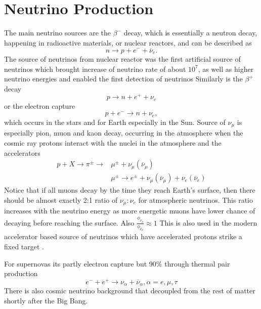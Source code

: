 \section{Neutrino Production}
The main neutrino sources \cite{FundamentalsOfNeutrinoPhysics.pdf} are the $\beta^-$ decay, which is essentially a neutron decay, happening in radioactive materials, or nuclear reactors, and can be described as
\begin{equation}
n\rightarrow p+e^-+\overline{\nu}_e.
\end{equation}
The source of neutrinos from nuclear reactor was the first artificial source of neutrinos which brought increase of neutrino rate of about $10^7$, as well as higher neutrino energies and enabled the first detection of neutrinos \cite{NeutrinoPhysicsCowanReines.pdf}
Similarly is the $\beta^+$ decay
\begin{equation}
p\rightarrow n+e^++\nu_e
\end{equation}
or the electron capture
\begin{equation}
p+e^-\rightarrow n+\nu_e,
\end{equation}
which occurs in the stars and for Earth especially in the Sun.
Source of $\nu_\mu$ is especially pion, muon and kaon decay, occurring in the atmosphere when the cosmic ray protons interact with the nuclei in the atmosphere and the accelerators
\begin{align}
p+X \rightarrow \pi^\pm \rightarrow &\mu^\pm + \nu_\mu\left(\overline{\nu}_\mu\right) \\
 & \mu^\pm \rightarrow e^\pm + \nu_\mu\left(\overline{\nu}_\mu\right) + \nu_e\left(\overline{\nu}_e\right)
\end{align}
Notice that if all muons decay by the time they reach Earth's surface, then there should be almost exactly 2:1 ratio of $\nu_\mu : \nu_e$ for atmospheric neutrinos. This ratio increases with the neutrino energy as more energetic muons have lower chance of decaying before reaching the surface. Also $\frac{\phi_{\nu_\mu}}{\phi_{\overline{\nu}_\mu}}\approx 1$ This is also used in the modern accelerator based source of neutrinos which have accelerated protons strike a fixed target \cite{GoodmanAdvancesInNeutrinoPhysics.pdf}\cite{SchwartzAccelerators.pdf}.

For supernovas its partly electron capture but 90\% through thermal pair production
\begin{equation}
e^-+e^+\rightarrow\nu_\alpha+\overline{\nu}_\alpha, \alpha=e,\mu,\tau
\end{equation}
There is also cosmic neutrino background that decoupled from the rest of matter shortly after the Big Bang.


